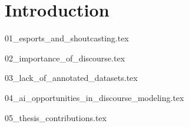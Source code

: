 \cleardoubleoddpage%
\chapter{Introduction}
\label{chp:introduction}

{01_esports_and_shoutcasting.tex}

{02_importance_of_discourse.tex}

{03_lack_of_annotated_datasets.tex}

{04_ai_opportunities_in_discourse_modeling.tex}

{05_thesis_contributions.tex}


